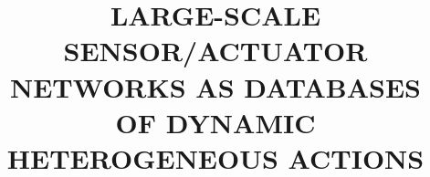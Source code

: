 \documentclass[a4paper, 12pt, oneside]{Thesis}  %
\begin{document}
\frontmatter	  %
\title  {LARGE-SCALE SENSOR/ACTUATOR NETWORKS AS DATABASES OF DYNAMIC HETEROGENEOUS ACTIONS}

\maketitle


\fancyhead{}  %
\rhead{\thepage}  %
\lhead{}  %
\pagestyle{fancy}  %

\addtocounter{page}{1}
\end{document}
